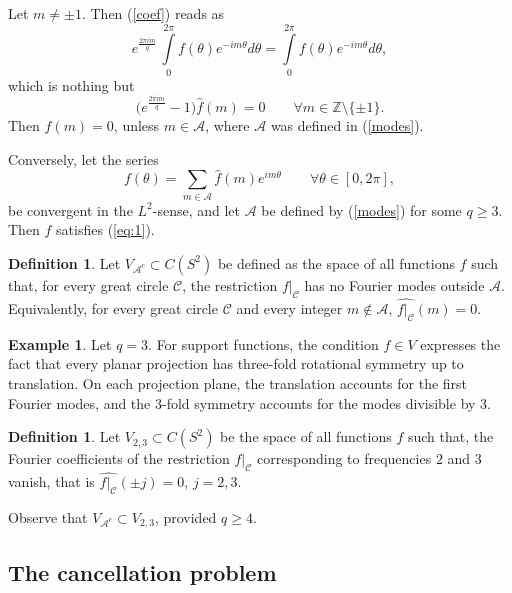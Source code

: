 \documentclass[11pt]{article}
\theoremstyle{definition}
\newtheorem{definition}[theorem]{Definition}
\newtheorem*{example}{Example}
\begin{document}
Let $m\neq \pm 1$. Then (\ref{coef}) reads as
$$
e^{\frac{2\pi i m}{q}}\,\int\limits_0^{2\pi}f(\theta) e^{-im\theta}d\theta=\int\limits_0^{2\pi}f(\theta) e^{-im\theta}d\theta,
$$
which is nothing but 
$$
\Big(e^{\frac{2\pi i m}{q}}-1\Big)\widehat{f}(m)=0\qquad \forall m\in {\mathbb Z}\setminus\{\pm1\}.
$$
Then $\widehat{f}(m)=0$, unless $m\in {\mathcal A}$, where ${\mathcal A}$ was defined in (\ref{modes}).

Conversely, let the series 
$$
f(\theta)=\sum\limits_{m\in{\mathcal A}}\widehat{f}(m)e^{im\theta} \qquad \forall \theta\in [0,2\pi],
$$
be convergent in the $L^2$-sense, and let 
 ${\mathcal A}$ be  defined  by (\ref{modes}) for some $q\ge 3$. Then $f$ satisfies (\ref{eq:1}). 

\begin{definition}\label{Adm1}
	Let \(V_{{\mathcal A}^c}\subset C(S^2)\) be defined as  the space of all functions \(f\) such that, for every great
	circle \({\mathcal C}\), the restriction \(f|_{\mathcal C}\) has no Fourier modes outside
	$\mathcal A$.
	Equivalently, for every great circle \({\mathcal C}\) and every integer \(m\notin\mathcal A\),
	$\widehat{f|_{\mathcal C}}(m)=0$.
\end{definition}

\begin{example}
	Let $q=3$. For support functions, the condition \(f\in V\) expresses the fact that every planar
	projection has three-fold rotational symmetry up to translation. On each projection plane,
	the translation accounts for the first Fourier modes, and the $3$-fold symmetry accounts
	for the modes divisible by \(3\).
\end{example}

\begin{definition}\label{Adm2}
Let  \(V_{2,3}\subset C(S^2)\) be the space of all functions \(f\) such that, 
the  Fourier coefficients of  the restriction  $f|_{\mathcal C}$ corresponding to frequencies $2$ and $3$ vanish, that is $\widehat{f|_{\mathcal C}}(\pm j)=0$, $j=2,3$.  
\end{definition}


	Observe  that $V_{{\mathcal A}^c}\subset V_{2,3}$, provided $q\ge 4$.






\subsection{The cancellation problem}
\end{document}
